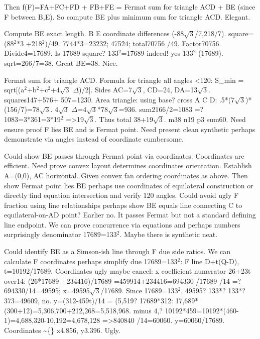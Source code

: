 \begin{decodedreasoningpanel}
Then f(F)=FA+FC+FD + FB+FE = Fermat sum for triangle ACD + BE (since F between B,E). So compute BE plus minimum sum for triangle ACD. Elegant.

Compute BE exact length. B E coordinate differences (-88\ensuremath{\sqrt{3}}/7,218/7). square=(88\ensuremath{^2}*3 +218\ensuremath{^2})/49. 7744*3=23232; 47524; total70756 /49. Factor70756. Divide4=17689. Is 17689 square? 133\ensuremath{^2}=17689 indeed! yes 133\ensuremath{^2} (17689). sqrt=266/7=38. Great BE=38. Nice.

Fermat sum for triangle ACD. Formula for triangle all angles \textless{}120:
S\_min = sqrt[(a\ensuremath{^2}+b\ensuremath{^2}+c\ensuremath{^2}+4\ensuremath{\sqrt{3}} \ensuremath{\Delta})/2].
Sides AC=7\ensuremath{\sqrt{3}}, CD=24, DA=13\ensuremath{\sqrt{3}}. squares147+576+
  507=1230.
Area triangle: using base? cross A C D: .5*(7\ensuremath{\sqrt{3}})*(156/7)=78\ensuremath{\sqrt{3}}. 4\ensuremath{\sqrt{3}} \ensuremath{\Delta}=4\ensuremath{\sqrt{3}}*78\ensuremath{\sqrt{3}}=936.
sum2166/2=1083 =? 1083=3*361=3*19\ensuremath{^2} =\textgreater{}19\ensuremath{\sqrt{3}}.
Thus total 38+19\ensuremath{\sqrt{3}}. m38 n19 p3 sum60. Need ensure proof F lies BE and is Fermat point. Need present clean synthetic perhaps demonstrate via angles instead of coordinate cumbersome.

Could show BE passes through Fermat point via coordinates. Coordinates are efficient. Need prove convex layout determines coordinates orientation. Establish A=(0,0), AC horizontal. Given convex fan ordering coordinates as above. Then show Fermat point lies BE perhaps use coordinates of equilateral construction or directly find equation intersection and verify 120 angles. Could avoid ugly F fraction using line relationships perhaps show BE equals line connecting C to equilateral-on-AD point? Earlier no. It passes Fermat but not a standard defining line endpoint. We can prove concurrence via equations and perhaps numbers surprisingly denominator 17689=133\ensuremath{^2}. Maybe there is synthetic neat.

Could identify BE as a Simson-ish line through F due side ratios. We can calculate F coordinates perhaps simplify due 17689=133\ensuremath{^2}:
F line D+t(Q-D), t=10192/17689.
Coordinates ugly maybe cancel:
x coefficient numerator 26+23t over14:
(26*17689 +234416)/17689 =459914+234416=694330 /17689 /14 =? 694330/14=49595; x=49595\ensuremath{\sqrt{3}}/17689. Since 17689=133\ensuremath{^2}, 49595? 133*? 133*? 373=49609, no.
y=(312-459t)/14 = (5,519? 17689*312: 17,689*(300+12)=5,306,700+212,268=5,518,968. minus 4,? 10192*459=10192*(460-1)=4,688,320-10,192=4,678,128 =\textgreater{}840840 /14=60060. y=60060/17689. Coordinates \textasciitilde\{\} x4.856, y3.396. Ugly.


\end{decodedreasoningpanel}
